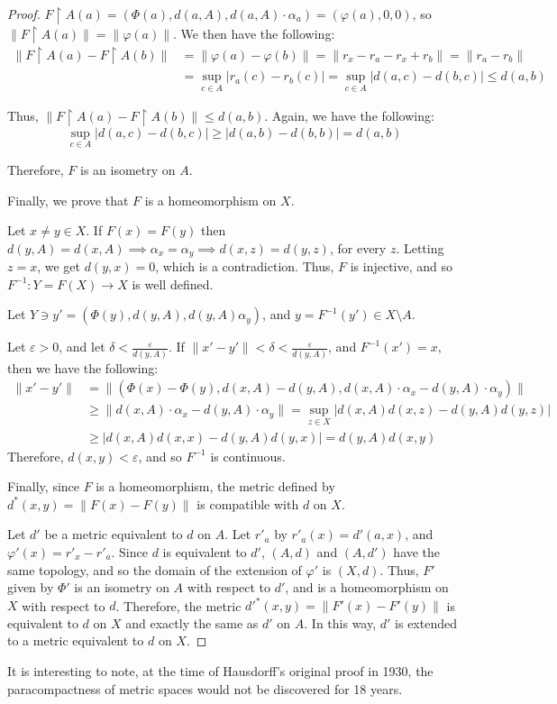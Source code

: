 \documentclass[openany, amssymb, psamsfonts]{amsart}
\theoremstyle{definition}
\numberwithin{equation}{section}
\begin{document}
\begin{proof}
  $F\restriction A (a) = (\Phi(a), d(a, A), d(a, A) \cdot \alpha_a) = (\varphi(a), 0, 0)$, so $\|F \restriction A(a)\| = \|\varphi(a)\|$. We then have the following:
  \begin{align*}
    \|F\restriction A(a) - F \restriction A (b) \|&=\|\varphi(a) - \varphi(b)\| = \|r_x - r_a - r_x + r_b\| = \|r_a - r_b\| \\
                                &= \sup_{c \in A} |r_a(c) - r_b(c) | = \sup_{c\in A} |d(a,c) - d(b,c)| \le d(a,b)
  \end{align*}

  Thus, $\|F\restriction A(a) - F \restriction A (b) \|\le d(a,b)$. Again, we have the following:
  \[
    \sup_{c\in A} |d(a,c) - d(b,c)| \ge |d(a,b) - d(b,b)| = d(a,b)
  \]

  Therefore, $F$ is an isometry on $A$. 

  Finally, we prove that $F$ is a homeomorphism on $X$. 

  Let $x\neq y \in X$. If $F(x) = F(y)$ then $d(y, A) = d(x,A) \implies \alpha_x = \alpha_y \implies d(x,z) = d(y,z)$, for every $z$. Letting $z = x$, we get $d(y,x) = 0$, which is a contradiction. Thus, $F$ is injective, and so $F^{-1}: Y = F(X) \to X$ is well defined.  

  Let $Y \ni y' = (\Phi(y), d(y,A), d(y,A) \alpha_y)$, and $y = F^{-1}(y') \in X \setminus A$.

  Let $\varepsilon > 0$, and let $\delta < \frac{\varepsilon}{d(y,A)}$. If $\|x' - y'\| < \delta < \frac{\varepsilon}{d(y,A)}$, and $F^{-1}(x') = x$, then we have the following:
  \begin{align*}
    \|x' - y'\| &= \|(\Phi(x) - \Phi(y), d(x,A) - d(y,A), d(x,A)\cdot \alpha_x - d(y,A)\cdot \alpha_y)\|\\
                &\ge \|d(x,A) \cdot\alpha_x - d(y,A) \cdot \alpha_y\|= \sup_{z\in X} |d(x,A) d(x,z) - d(y,A) d(y,z)| \\
                &\ge |d(x, A) d(x,x) - d(y,A)d(y,x)|= d(y,A)d(x,y) 
  \end{align*}
  Therefore, $d(x,y) < \varepsilon$, and so $F^{-1}$ is continuous. 

  Finally, since $F$ is a homeomorphism, the metric defined by $d^\ast(x,y) = \| F(x) - F(y)\|$ is compatible with $d$ on $X$. 

  Let $d'$ be a metric equivalent to $d$ on $A$. Let $r'_a$ by $r'_a(x) = d'(a,x)$, and $\varphi'(x) = r'_x - r'_a$. Since $d$ is equivalent to $d'$, $(A,d)$ and $(A,d')$ have the same topology, and so the domain of the extension of $\varphi'$ is $(X,d)$. Thus, $F'$ given by $\Phi'$ is an isometry on $A$ with respect to $d'$, and is a homeomorphism on $X$ with respect to $d$. Therefore, the metric $d'^\ast(x,y) = \|F'(x) - F'(y)\|$ is equivalent to $d$ on $X$ and exactly the same as $d'$ on $A$. In this way, $d'$ is extended to a metric equivalent to $d$ on $X$. 
\end{proof}
It is interesting to note, at the time of Hausdorff's original proof in 1930, the paracompactness of metric spaces would not be discovered for 18 years.
\end{document}
